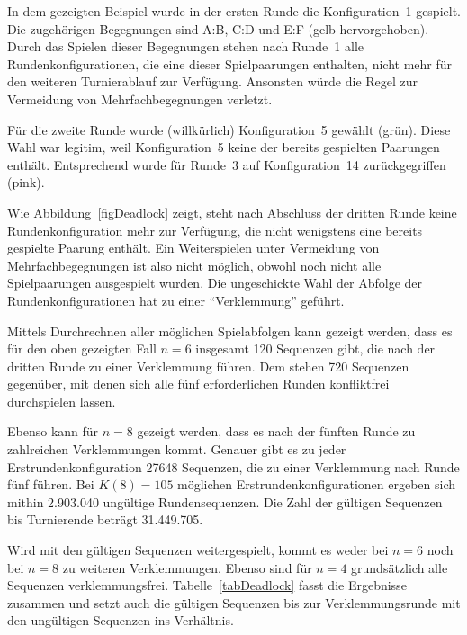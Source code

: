\documentclass[DIV=15, 10pt]{scrartcl}
\begin{document}
In dem gezeigten Beispiel wurde in der ersten Runde die Konfiguration~1 gespielt. Die zugehörigen Begegnungen sind A:B, C:D und E:F (gelb hervorgehoben). Durch das Spielen dieser Begegnungen stehen nach Runde~1 alle Rundenkonfigurationen, die eine dieser Spielpaarungen enthalten, nicht mehr für den weiteren Turnierablauf zur Verfügung. Ansonsten würde die Regel zur Vermeidung von Mehrfachbegegnungen verletzt.

Für die zweite Runde wurde (willkürlich) Konfiguration~5 gewählt (grün). Diese Wahl war legitim, weil Konfiguration~5 keine der bereits gespielten Paarungen enthält. Entsprechend wurde für Runde~3 auf Konfiguration~14 zurückgegriffen (pink).

Wie Abbildung~\ref{figDeadlock} zeigt, steht nach Abschluss der dritten Runde keine Rundenkonfiguration mehr zur Verfügung, die nicht wenigstens eine bereits gespielte Paarung enthält. Ein Weiterspielen unter Vermeidung von Mehrfachbegegnungen ist also nicht möglich, obwohl noch nicht alle Spielpaarungen ausgespielt wurden. Die ungeschickte Wahl der Abfolge der Rundenkonfigurationen hat zu einer "`Verklemmung"' geführt.

Mittels Durchrechnen aller möglichen Spielabfolgen kann gezeigt werden, dass es für den oben gezeigten Fall $n=6$ insgesamt 120 Sequenzen gibt, die nach der dritten Runde zu einer Verklemmung führen. Dem stehen 720 Sequenzen gegenüber, mit denen sich alle fünf erforderlichen Runden konfliktfrei durchspielen lassen.

Ebenso kann für $n=8$ gezeigt werden, dass es nach der fünften Runde zu zahlreichen Verklemmungen kommt. Genauer gibt es zu jeder Erstrundenkonfiguration 27648 Sequenzen, die zu einer Verklemmung nach Runde fünf führen. Bei $K(8) = 105$ möglichen Erstrundenkonfigurationen ergeben sich mithin 2.903.040 ungültige Rundensequenzen. Die Zahl der gültigen Sequenzen bis Turnierende beträgt 31.449.705.

Wird mit den gültigen Sequenzen weitergespielt, kommt es weder bei $n=6$ noch bei $n=8$ zu weiteren Verklemmungen. Ebenso sind für $n=4$ grundsätzlich alle Sequenzen verklemmungsfrei. Tabelle~\ref{tabDeadlock} fasst die Ergebnisse zusammen und setzt auch die gültigen Sequenzen bis zur Verklemmungsrunde mit den ungültigen Sequenzen ins Verhältnis.
\end{document}
